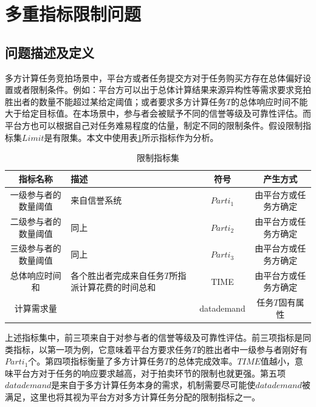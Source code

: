 \documentclass[promaster]{thesis-uestc}
\begin{document}
\section{多重指标限制问题}
\label{dptou}
\subsection{问题描述及定义}
    多方计算任务竞拍场景中，平台方或者任务提交方对于任务购买方存在总体偏好设置或者限制条件。例如：平台方可以出于总体计算结果来源异构性等需求要求竞拍胜出者的数量不能超过某给定阈值；或者要求多方计算任务$T$的总体响应时间不能大于给定目标值。在本场景中，参与者会被赋予不同的信誉等级及可靠性评估。而平台方也可以根据自己对任务难易程度的估量，制定不同的限制条件。假设限制指标集$Limit$是有限集。本文中使用表\ref{zhibiao}所示指标作为分析。

\newcommand{\tabincell}[2]{\begin{tabular}{@{}#1@{}}#2\end{tabular}} %

\begin{table}[h]
\caption{限制指标集}
\label{zhibiao}
\begin{tabular}{cp{10em}cc}
    \toprule
    指标名称& 描述&符号&产生方式\\
    \midrule
    一级参与者的数量阈值&来自信誉系统&$Parti_1$&由平台方或任务方确定\\
    二级参与者的数量阈值& 同上&$Parti_2$&由平台方或任务方确定\\
    三级参与者的数量阈值& 同上&$Parti_3$&由平台方或任务方确定\\
    总体响应时间和&各个胜出者完成来自任务$T$所指派计算花费的时间总和&TIME&由平台方或任务方确定\\
    计算需求量&&datademand&任务$T$固有属性\\
    \bottomrule
\end{tabular}
\end{table}

上述指标集中，前三项来自于对参与者的信誉等级及可靠性评估。前三项指标是同类指标，以第一项为例，它意味着平台方要求任务$T$的胜出者中一级参与者刚好有$Parti_1$个。第四项指标衡量了多方计算任务$T$的总体完成效率。$TIME$值越小，意味平台方对于任务的响应要求越高，对于拍卖环节的限制也就更强。第五项$datademand$是来自于多方计算任务本身的需求，机制需要尽可能使$datademand$被满足，这里也将其视为平台方对多方计算任务分配的限制指标之一。
\end{document}
